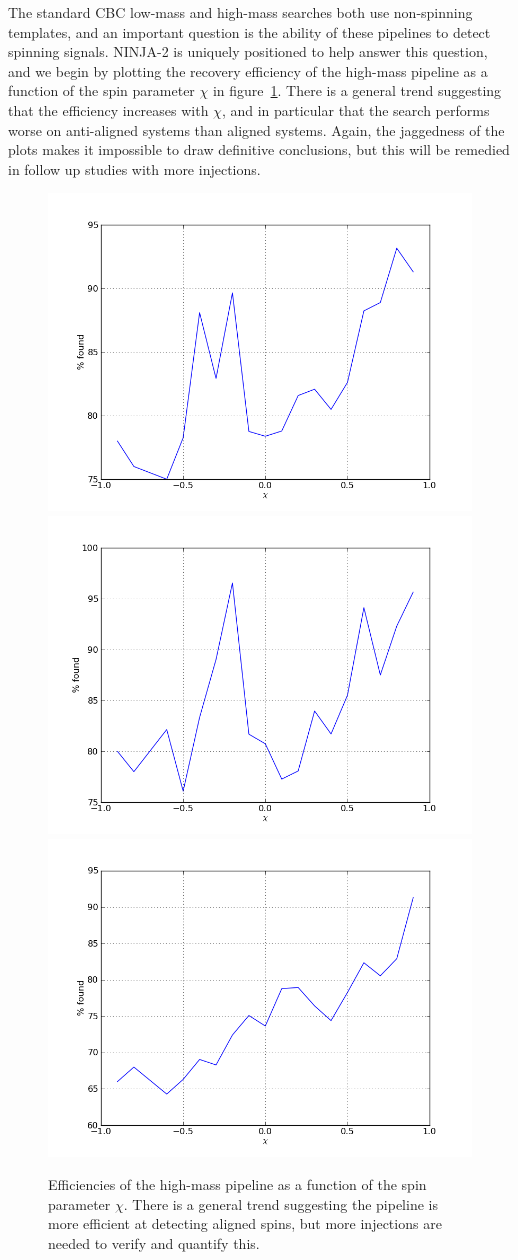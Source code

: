 The standard CBC low-mass and high-mass searches both use non-spinning
templates, and an important question is the ability of these pipelines
to detect spinning signals.  NINJA-2 is uniquely positioned to help
answer this question, and we begin by plotting the recovery efficiency
of the high-mass pipeline as a function of the spin parameter $\chi$
in figure~\ref{f:high_spin_efficiencies}.  There is a general trend
suggesting that the efficiency increases with $\chi$, and in
particular that the search performs worse on anti-aligned systems than
aligned systems.  Again, the jaggedness of the plots makes it
impossible to draw definitive conclusions, but this will be remedied in
follow up studies with more injections.



\begin{figure}
  \includegraphics[width=0.5\linewidth]{figures/ninja2_results/H_second_spin_high_efficiency}
  \includegraphics[width=0.5\linewidth]{figures/ninja2_results/L_second_spin_high_efficiency} \\
  \includegraphics[width=0.5\linewidth]{figures/ninja2_results/V_second_spin_high_efficiency}
  \caption[Efficiency of the high-mass pipeline as a function of mass]{
  \label{f:high_spin_efficiencies}
Efficiencies of the high-mass pipeline as a function of the spin
parameter $\chi$.  There is a general trend suggesting the pipeline
is more efficient at detecting aligned spins, but more injections are
needed to verify and quantify this.
}
\end{figure}%


